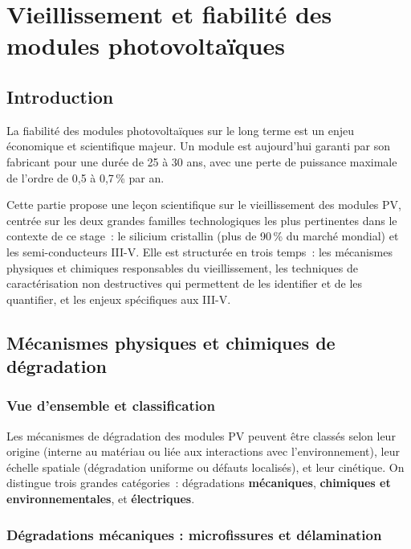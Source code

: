 \documentclass[12pt,a4paper]{report}
\begin{document}
\chapter{Vieillissement et fiabilité des modules photovoltaïques}

\section*{Introduction}

La fiabilité des modules photovoltaïques sur le long terme est un enjeu économique et scientifique majeur. Un module est aujourd'hui garanti par son fabricant pour une durée de 25 à 30 ans, avec une perte de puissance maximale de l'ordre de 0,5 à 0,7\,\% par an.

Cette partie propose une leçon scientifique sur le vieillissement des modules PV, centrée sur les deux grandes familles technologiques les plus pertinentes dans le contexte de ce stage~: le silicium cristallin (plus de 90\,\% du marché mondial) et les semi-conducteurs III-V. Elle est structurée en trois temps~: les mécanismes physiques et chimiques responsables du vieillissement, les techniques de caractérisation non destructives qui permettent de les identifier et de les quantifier, et les enjeux spécifiques aux III-V.

\section{Mécanismes physiques et chimiques de dégradation}

\subsection{Vue d'ensemble et classification}

Les mécanismes de dégradation des modules PV peuvent être classés selon leur origine (interne au matériau ou liée aux interactions avec l'environnement), leur échelle spatiale (dégradation uniforme ou défauts localisés), et leur cinétique. On distingue trois grandes catégories~: dégradations \textbf{mécaniques}, \textbf{chimiques et environnementales}, et \textbf{électriques}.

\subsection{Dégradations mécaniques : microfissures et délamination}
\end{document}
